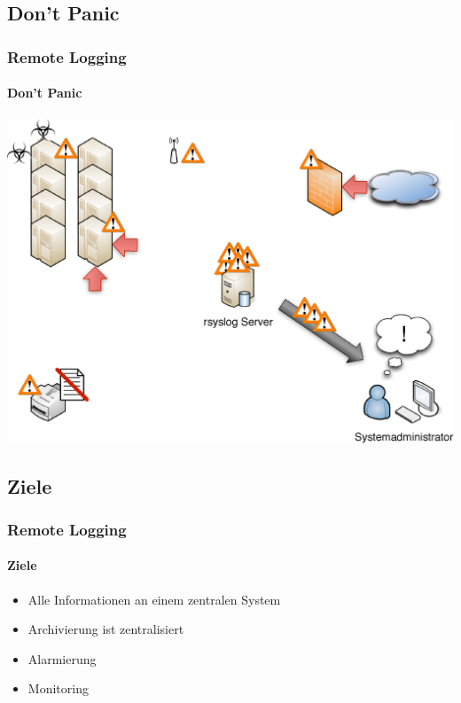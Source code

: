 \subsection{Don't Panic}
\begin{frame}[plain]
	\frametitle{Remote Logging}
	\framesubtitle{Don't Panic}
	\begin{center}
		\includegraphics[width=\linewidth]{images/remote_logging_03.eps}
	\end{center}
\end{frame}

\subsection{Ziele}
\begin{frame}
	\frametitle{Remote Logging}
	\framesubtitle{Ziele}
	\begin{itemize}
		\item Alle Informationen an einem zentralen System
		\item Archivierung ist zentralisiert
		\item Alarmierung
		\item Monitoring
	\end{itemize}
\end{frame}